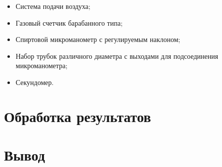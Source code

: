 \documentclass[12pt]{article}
\begin{document}
\begin{itemize}
	\item Система подачи воздуха;
	\item Газовый счетчик барабанного типа;
	\item Спиртовой микроманометр с регулируемым наклоном;
	\item Набор трубок различного диаметра с выходами для подсоединения микроманометра;
	\item Секундомер.
\end{itemize}

\section{Обработка результатов}



\section{Вывод}
\end{document}
